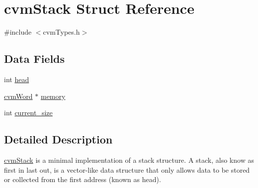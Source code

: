 \hypertarget{structcvm_stack}{\section{cvm\-Stack Struct Reference}
\label{structcvm_stack}
}


{\ttfamily \#include $<$cvm\-Types.\-h$>$}

\subsection*{Data Fields}
\begin{DoxyCompactItemize}
\item 
int \hyperlink{structcvm_stack_a20358970b1abaf992eb85e071e454653}{head}
\item 
\hyperlink{cvm_types_8h_a53f56afae5106d482ea7690891c4b668}{cvm\-Word} $\ast$ \hyperlink{structcvm_stack_a85478df6a4c8ac08ce55d50177351a65}{memory}
\item 
int \hyperlink{structcvm_stack_afb54d9f9368a5e14e68aa90ba2d53d40}{current\-\_\-size}
\end{DoxyCompactItemize}


\subsection{Detailed Description}
\hyperlink{structcvm_stack}{cvm\-Stack} is a minimal implementation of a stack structure. A stack, also know as first in last out, is a vector-\/like data structure that only allows data to be stored or collected from the first address (known as head). 

